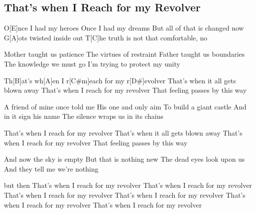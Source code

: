\subsection*{That's when I Reach for my Revolver   }
\begin{guitar}
O[E]nce I had my heroes
Once I had my dreams
But all of that is changed now
G[A]ots twisted inside out
T[C]he truth is not that comfortable, no



Mother taught us patience
The virtues of restraint
Father taught us boundaries
The knowledge we must go
I'm trying to protect my unity



Th[B]at's wh[A]en I r[C#m]each for my r[D#]evolver
That's when it all gets blown away
That's when I reach for my revolver
That feeling passes by this way



A friend of mine once told me
His one and only aim
To build a giant castle
And in it sign his name
The silence wraps us in its chains



That's when I reach for my revolver
That's when it all gets blown away
That's when I reach for my revolver
That feeling passes by this way



And now the sky is empty
But that is nothing new
The dead eyes look upon us
And they tell me 
we're nothing 



but then
That's when I reach for my revolver
That's when I reach for my revolver
That's when I reach for my revolver
That's when I reach for my revolver
That's when I reach for my revolver
That's when I reach for my revolver
\end{guitar}
